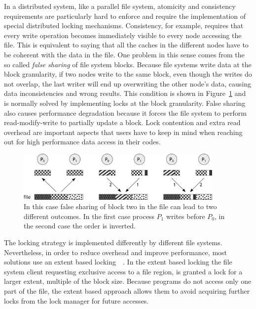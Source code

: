In a distributed system, like a parallel file system, atomicity and consistency requirements are particularly hard to enforce and require the implementation of special distributed locking mechanisms. Consistency, for
example, requires that every write operation becomes immediately visible to every node accessing the file. This is equivalent to saying that all the caches in the different nodes have to be coherent with the data in the 
file. One problem in this sense comes from the so called \textit{false sharing} of file system blocks. Because file systems write data at the block granularity, if two nodes write to the same block, even though the writes 
do not overlap, the last writer will end up overwriting the other node's data, causing data inconsistencies and wrong results. This condition is shown in Figure~\ref{figure: false-sharing} and is normally solved by 
implementing locks at the block granularity. False sharing also causes performance degradation because it forces the file system to perform read-modify-write to partially update a block. Lock contention and extra read 
overhead are important aspects that users have to keep in mind when reaching out for high performance data access in their codes.

\begin{figure}[!htb]
\centering
\includegraphics[width=0.9\textwidth]{figures/false-sharing}
\caption{In this case false sharing of block two in the file can lead to two different outcomes. In the first case process $P_1$ writes before $P_0$, in the second case the order is inverted.}
\label{figure: false-sharing}
\end{figure}

The locking strategy is implemented differently by different file systems. Nevertheless, in order to reduce overhead and improve performance, most solutions use an extent based locking~\cite{Braam02}~\cite{SchmuckH02}. In the 
extent based locking the file system client requesting exclusive access to a file region, is granted a lock for a larger extent, multiple of the block size. Because programs do not access only one part of the file, the extent 
based approach allows them to avoid acquiring further locks from the lock manager for future accesses.

